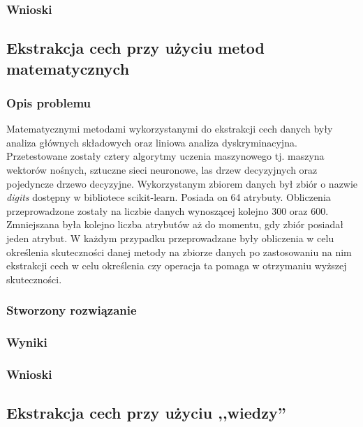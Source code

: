 \subsubsection{Wnioski}

\subsection{Ekstrakcja cech przy użyciu metod matematycznych}

\subsubsection{Opis problemu}
Matematycznymi metodami wykorzystanymi do ekstrakcji cech danych były analiza głównych składowych oraz liniowa analiza dyskryminacyjna. Przetestowane zostały cztery algorytmy uczenia maszynowego tj. maszyna wektorów nośnych, sztuczne sieci neuronowe, las drzew decyzyjnych oraz pojedyncze drzewo decyzyjne. Wykorzystanym zbiorem danych był zbiór o nazwie \textit{digits} dostępny w bibliotece scikit-learn. Posiada on 64 atrybuty. Obliczenia przeprowadzone zostały na liczbie danych wynoszącej kolejno 300 oraz 600. Zmniejszana była kolejno liczba atrybutów aż do momentu, gdy zbiór posiadał jeden atrybut. W każdym przypadku przeprowadzane były obliczenia w celu określenia skuteczności danej metody na zbiorze danych po zastosowaniu na nim ekstrakcji cech w celu określenia czy operacja ta pomaga w otrzymaniu wyższej skuteczności.

\subsubsection{Stworzony rozwiązanie}
\subsubsection{Wyniki}
\subsubsection{Wnioski}

\subsection{Ekstrakcja cech przy użyciu ,,wiedzy''}
